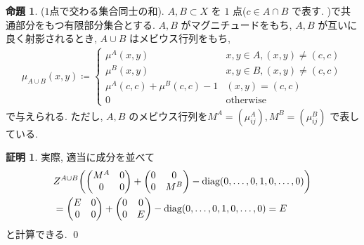 \documentclass[10pt, fleqn, label-section=none]{bxjsarticle}
\theoremstyle{definition}
\newtheorem{prop}[dfn]{命題}
\newtheorem*{pf*}{証明}
\newcommand{\paren}[1]{\mleft( #1\mright )}
\newcommand{\diag}{\textrm{diag}}
\renewcommand{\;}{\, ; \,}
\newcommand{\gyouretsu}[1]{\begin{pmatrix} #1 \end{pmatrix} }
\begin{document}
\begin{prop}($1$点で交わる集合同士の和). $A, B \subset X$ を $1$ 点($c \in A\cap B$ で表す. )で共通部分をもつ有限部分集合とする. $A, B$ がマグニチュードをもち, $A, B$ が互いに良く射影されるとき, $A \cup B$ はメビウス行列をもち, 
\begin{align*} \mu_{A \cup B}( x, y) \coloneqq \begin{cases} \mu^A(x, y)  & x, y \in A, (x, y) \neq  (c, c) \\ \mu^B(x, y)  & x, y \in B , (x, y) \neq  (c, c) \\ \mu^A(c, c) + \mu^B (c, c) - 1 & (x, y) = (c, c)  \\ 0 & \textrm{otherwise} \end{cases} \end{align*}
で与えられる. ただし, $A, B$ のメビウス行列を$M^A = (\mu^A_{ij}), M^B = (\mu^B_{ij})$ で表している. 

\end{prop}
\begin{pf*}実際, 適当に成分を並べて
\begin{align*} &Z^{A\cup B} \paren{ \gyouretsu{ M^A & 0 \\ 0 & 0   } + \gyouretsu{ 0 & 0 \\ 0 & M^B   } - \diag(0, \ldots ,0,  1 , 0, \ldots , 0) }  \\ & =   \gyouretsu{ E & 0 \\ 0 & 0   } +  \gyouretsu{ 0 & 0 \\ 0 & E   } -  \diag(0, \ldots ,0,  1 , 0, \ldots , 0)  = E \end{align*}
と計算できる. 
\qed
\end{pf*}
\end{document}
